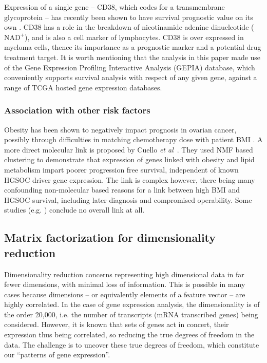 \documentclass[tikz, 11pt,a4paper,oneside,fleqn]{article}
\newcommand{\etal}{{\em et al\/}}
\begin{document}
Expression of a single gene -- CD38, which codes for a transmembrane glycoprotein -- has recently been shown to have survival prognostic value on its own \cite{Zhu2020}.
CD38 has a role in the breakdown of nicotinamide adenine dinucleotide ($\mbox{NAD}^+$), and is also a cell marker of lymphocytes.
CD38 is over expressed in myeloma cells, thence its importance as a prognostic marker and a potential drug treatment target.  
It is worth mentioning that the analysis in this paper made use of the Gene Expression Profiling Interactive Analysis (GEPIA) database, which conveniently supports survival analysis with respect of any given gene, against a range of TCGA hosted gene expression databases.

\subsubsection{Association with other risk factors}

Obesity has been shown to negatively impact prognosis in ovarian cancer, possibly through difficulties in matching chemotherapy dose with patient BMI  \cite{Au-Yeung2014}.  A more direct molecular link is proposed by Cuello \etal\ \cite{Cuello2018}.  They used NMF based clustering to demonstrate that expression of genes linked with obesity and lipid metabolism impart poorer progression free survival, independent of known HGSOC driver gene expression.  The link is complex however, there being many confounding non-molecular based reasons for a link between high BMI and HGSOC survival, including later diagnosis and compromised operability.  Some studies (e.g. \cite{Hew2013}) conclude no overall link at all.


\subsection{Matrix factorization for dimensionality reduction}
\label{sec-matrix-factorization-intro}

Dimensionality reduction concerns representing high dimensional data in far fewer dimensions, with minimal loss of information.  This is possible in many cases because dimensions -- or equivalently elements of a feature vector -- are highly correlated.  In the case of gene expression analysis, the dimensionality is of the order 20,000, i.e. the number of transcripts (mRNA transcribed genes) being considered.  However, it is known that sets of genes act in concert, their expression thus being correlated, so reducing the true degrees of freedom in the data.  The challenge is to uncover these true degrees of freedom, which constitute our ``patterns of gene expression''.
\end{document}
